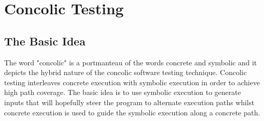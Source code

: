 \chapter{Concolic Testing}\label{ch:concolic_testing}

\section{The Basic Idea}\label{sec:conc_basic_idea}

The word "concolic" is a portmanteau of the words concrete and symbolic and it
depicts the hybrid nature of the concolic software testing technique. Concolic testing
interleaves concrete execution with symbolic execution in order to achieve high
path coverage. The basic idea is to use symbolic execution to generate inputs
that will hopefully steer the program to alternate execution paths whilst
concrete execution is used to guide the symbolic execution along a concrete
path.
